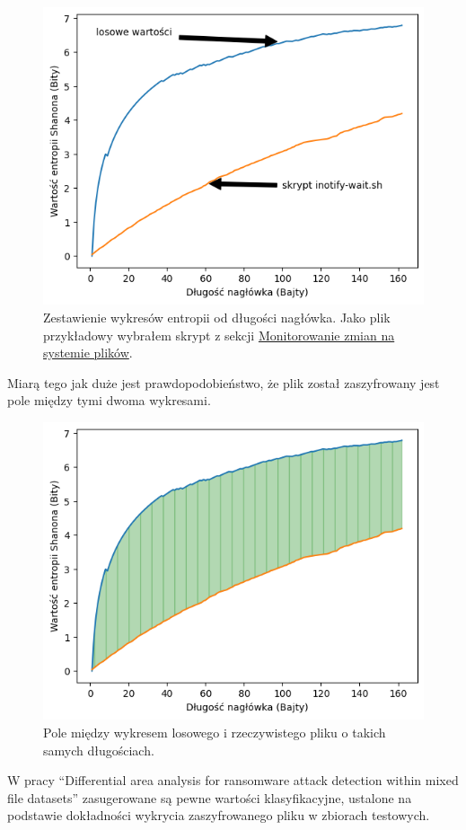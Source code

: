\begin{figure}[H]
    \centering
    \includegraphics[width=0.7\linewidth]{rysunki/zestawienie.png}
    \caption{Zestawienie wykresów entropii od długości nagłówka. Jako plik przykładowy wybrałem skrypt z sekcji \hyperref[sec:monitorowanie]{Monitorowanie zmian na systemie plików}.}
    \label{fig:enter-label}
\end{figure}
Miarą tego jak duże jest prawdopodobieństwo, że plik został zaszyfrowany jest pole między tymi dwoma wykresami.
\begin{figure}[H]
    \centering
    \includegraphics[width=0.7\linewidth]{rysunki/pole.png}
    \caption{Pole między wykresem losowego i rzeczywistego pliku o takich samych długościach.}
    \label{fig:enter-label}
\end{figure}
W pracy \foreignquote{english}{Differential area analysis for ransomware
attack detection within mixed file datasets} zasugerowane są pewne wartości klasyfikacyjne, ustalone na podstawie
dokładności wykrycia zaszyfrowanego pliku w zbiorach testowych.
